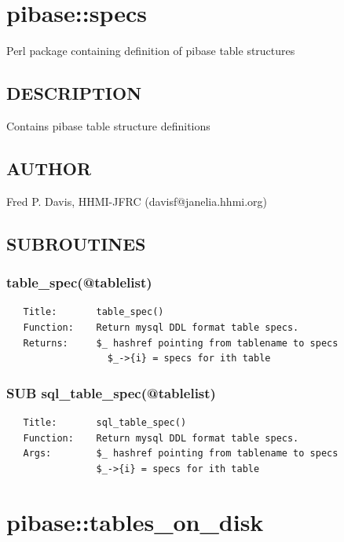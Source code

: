 \documentclass{article}
\begin{document}
\section{pibase::specs\label{pibase::specs}}


Perl package containing definition of pibase table structures

\subsection*{DESCRIPTION\label{pibase::specs_DESCRIPTION}}


Contains pibase table structure definitions

\subsection*{AUTHOR\label{pibase::specs_AUTHOR}}


Fred P. Davis, HHMI-JFRC (davisf@janelia.hhmi.org)

\subsection*{SUBROUTINES\label{pibase::specs_SUBROUTINES}}
\subsubsection*{table\_spec(@tablelist)\label{pibase::specs_table_spec_tablelist_}}
\begin{verbatim}
   Title:       table_spec()
   Function:    Return mysql DDL format table specs.
   Returns:     $_ hashref pointing from tablename to specs
                  $_->{i} = specs for ith table
\end{verbatim}
\subsubsection*{SUB sql\_table\_spec(@tablelist)\label{pibase::specs_SUB_sql_table_spec_tablelist_}}
\begin{verbatim}
   Title:       sql_table_spec()
   Function:    Return mysql DDL format table specs.
   Args:        $_ hashref pointing from tablename to specs
                $_->{i} = specs for ith table
\end{verbatim}
\clearpage
\section{pibase::tables\_on\_disk\label{pibase::tables_on_disk}}
\end{document}
